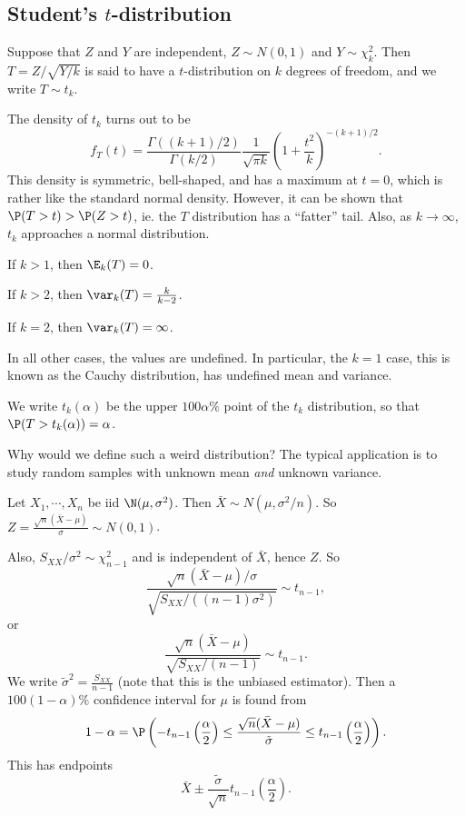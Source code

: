 \documentclass[a4paper]{article}
\begin{document}
\subsection{Student's \texorpdfstring{$t$}{t}-distribution}
\begin{defi}[$t$-distribution]
  Suppose that $Z$ and $Y$ are independent, $Z\sim N(0, 1)$  and $Y\sim \chi_k^2$. Then $T = Z/\sqrt{Y/k}$ is said to have a $t$-distribution on $k$ degrees of freedom, and we write $T\sim t_k$.
\end{defi}

The density of $t_k$ turns out to be
\[
  f_T(t) = \frac{\Gamma((k + 1)/2)}{\Gamma(k/2)} \frac{1}{\sqrt{\pi k}}\left(1 + \frac{t^2}{k}\right)^{-(k+1)/2}.
\]
This density is symmetric, bell-shaped, and has a maximum at $t = 0$, which is rather like the standard normal density. However, it can be shown that $\P(T > t) > \P(Z > t)$, ie. the $T$ distribution has a ``fatter'' tail. Also, as $k \to \infty$, $t_k$ approaches a normal distribution.

\begin{prop}
  If $k > 1$, then $\E_k(T) = 0$.

  If $k > 2$, then $\var_k(T) = \frac{k}{k - 2}$.

  If $k = 2$, then $\var_k(T) = \infty$.

  In all other cases, the values are undefined. In particular, the $k = 1$ case, this is known as the Cauchy distribution, has undefined mean and variance.
\end{prop}

\begin{notation}
  We write $t_k(\alpha)$ be the upper $100\alpha\%$ point of the $t_k$ distribution, so that $\P(T > t_k(\alpha)) = \alpha$.
\end{notation}

Why would we define such a weird distribution? The typical application is to study random samples with unknown mean \emph{and} unknown variance.

Let $X_1, \cdots, X_n$ be iid $\N(\mu, \sigma^2)$. Then $\bar X \sim N(\mu, \sigma^2/n)$. So $Z = \frac{\sqrt{n}(\bar X - \mu)}{\sigma} \sim N(0, 1)$.

Also, $S_{XX}/\sigma^2 \sim \chi^2_{n - 1}$ and is independent of $\bar X$, hence $Z$. So
\[
  \frac{\sqrt{n}(\bar X - \mu)/\sigma}{\sqrt{S_{XX}/((n - 1)\sigma^2)}} \sim t_{n - 1},
\]
or
\[
  \frac{\sqrt{n}(\bar X - \mu)}{\sqrt{S_{XX}/(n - 1)}} \sim t_{n - 1}.
\]
We write $\tilde{\sigma}^2 = \frac{S_{XX}}{n - 1}$ (note that this is the unbiased estimator). Then a $100(1 - \alpha)\%$ confidence interval for $\mu$ is found from
\[
  1 - \alpha = \P\left(-t_{n - 1}\left(\frac{\alpha}{2}\right) \leq \frac{\sqrt{n}(\bar X - \mu)}{\tilde{\sigma}} \leq t_{n - 1}\left(\frac{\alpha}{2}\right)\right).
\]
This has endpoints
\[
  \bar X \pm \frac{\tilde{\sigma}}{\sqrt{n}}t_{n - 1}\left(\frac{\alpha}{2}\right).
\]
\end{document}
